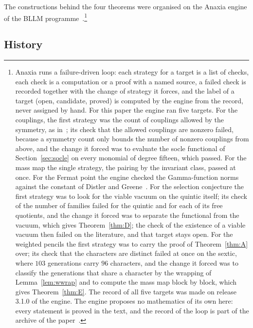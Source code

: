 \documentclass[11pt]{amsart}
\theoremstyle{definition}
\theoremstyle{remark}
\begin{document}
The constructions behind the four theorems were organised on the Anaxia
engine of the BLLM programme~\cite{Ana26,BB26}.\footnote{Anaxia runs a
failure-driven loop: each strategy for a target is a list of checks, each
check is a computation or a proof with a named source, a failed check is
recorded together with the change of strategy it forces, and the label of a
target (open, candidate, proved) is computed by the engine from the record,
never assigned by hand. For this paper the engine ran five targets. For the
couplings, the first strategy was the count of couplings allowed by the
symmetry, as in~\cite{DGJ08}; its check that the allowed couplings are
nonzero failed, because a symmetry count only bounds the number of nonzero
couplings from above, and the change it forced was to evaluate the socle
functional of Section~\ref{sec:socle} on every monomial of degree fifteen,
which passed. For the mass map the single strategy, the pairing by the
invariant class, passed at once. For the Fermat point the engine checked the
Gamma-function norms against the constant of Distler and
Greene~\cite{DG88}. For the selection conjecture the first strategy was to
look for the viable vacuum on the quintic itself; its check of the number
of families failed for the quintic and for each of its free quotients, and
the change it forced was to separate the functional from the vacuum, which
gives Theorem~\ref{thm:D}; the check of the existence of a viable vacuum
then failed on the literature, and that target stays open. For the
weighted pencils the first strategy was to carry the proof of
Theorem~\ref{thm:A} over; its check that the characters are distinct
failed at once on the sextic, where $103$ generations carry $96$
characters, and the change it forced was to classify the generations that
share a character by the wrapping of Lemma~\ref{lem:wwrap} and to compute
the mass map block by block, which gives Theorem~\ref{thm:E}. The record
of all five targets was made on release 3.1.0 of the engine. The engine
proposes no mathematics of its own here: every statement is proved in the
text, and the record of the loop is part of the archive of the
paper~\cite{Repo}.}


\subsection*{History}
\end{document}
